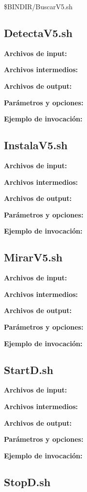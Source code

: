 \documentclass[a4paper,12pt]{article}
\begin{document}
\$BINDIR/BuscarV5.sh



\subsection{ DetectaV5.sh }

{\bf Archivos de input:} 

{\bf Archivos intermedios:} 

{\bf Archivos de output:} 

{\bf Parámetros y opciones:} 

{\bf Ejemplo de invocación:} 


\subsection{ InstalaV5.sh }

{\bf Archivos de input:} 

{\bf Archivos intermedios:} 

{\bf Archivos de output:} 

{\bf Parámetros y opciones:} 

{\bf Ejemplo de invocación:} 


\subsection{  MirarV5.sh }

{\bf Archivos de input:} 

{\bf Archivos intermedios:} 

{\bf Archivos de output:} 

{\bf Parámetros y opciones:} 

{\bf Ejemplo de invocación:} 


\subsection{ StartD.sh }

{\bf Archivos de input:} 

{\bf Archivos intermedios:} 

{\bf Archivos de output:} 

{\bf Parámetros y opciones:} 

{\bf Ejemplo de invocación:} 


\subsection{ StopD.sh }
\end{document}

